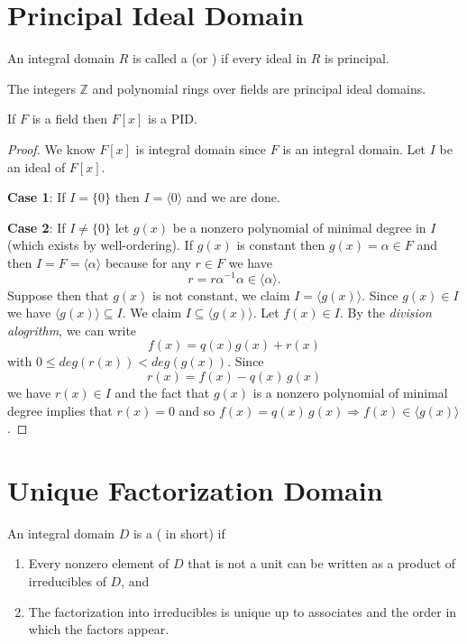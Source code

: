 \section{Principal Ideal Domain}

\begin{definition}
    An integral domain $R$ is called a  (or ) if every ideal in $R$ is principal.
\end{definition}

\begin{example}
    The integers $\mathbb{Z}$ and polynomial rings over fields are principal ideal domains.
\end{example}

\begin{theorem}
    If $F$ is a field then $F[x]$ is a PID.
\end{theorem}
\begin{proof}
    We know $F[x]$ is integral domain since $F$ is an integral domain. Let $I$ be an ideal of 
    $F[x]$.

    \textbf{Case 1}: If $I = \{ 0 \}$ then $I = \langle 0 \rangle$ and we are done.

    \textbf{Case 2}: If $I \neq \{ 0 \}$ let $g(x)$ be a nonzero polynomial of minimal degree in 
    $I$ (which exists by well-ordering). If $g(x)$ is constant then $g(x) = \alpha \in F$ and then 
    $I = F = \langle \alpha \rangle$ because for any $r \in F$ we have 
    \[
        r = r\alpha^{-1} \alpha \in \langle \alpha \rangle.
    \]
    Suppose then that $g(x)$ is not constant, we claim $I = \langle g(x) \rangle$. Since 
    $g(x) \in I$ we have $\langle g(x) \rangle \subseteq I$. We claim $I \subseteq \langle g(x) \rangle$. 
    Let $f(x) \in I$. By the \textit{division alogrithm}, we can write 
    \[
        f(x) = q(x)g(x) + r(x)
    \]
    with $0 \leq deg(r(x)) < deg(g(x))$. Since 
    \[
        r(x) = f(x) - q(x)\, g(x)
    \]
    we have $r(x) \in I$ and the fact that $g(x)$ is a nonzero polynomial of minimal degree implies 
    that $r(x) = 0$ and so $f(x) = q(x)\, g(x) \Longrightarrow  f(x) \in \langle g(x) \rangle$.
\end{proof}

\newpage
\section{Unique Factorization Domain}

\begin{definition}
    An integral domain $D$ is a  ( in short) 
    if 
    \begin{enumerate}
        \item Every nonzero element of $D$ that is not a unit can be written as a product of 
        irreducibles of $D$, and
        \item The factorization into irreducibles is unique up to associates and the order in which 
        the factors appear. 
    \end{enumerate}
\end{definition}

